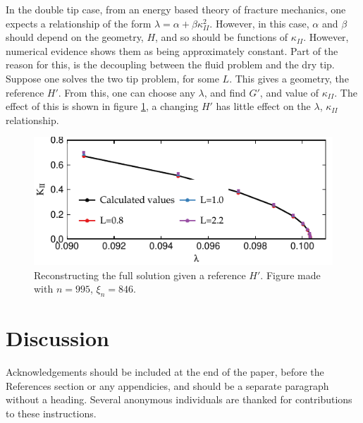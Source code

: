 \documentclass{jfm}
\begin{document}
In the double tip case, from an energy based theory of fracture mechanics,
one expects a relationship of the form $\lambda = \alpha + \beta 
\kappa_{II}^2$. However, in this case, $\alpha$ and $\beta$ should depend on 
the geometry, $H$, and so should be functions of $\kappa_{II}$. However, 
numerical evidence shows them as being approximately constant. Part of the 
reason for this, is the decoupling between the fluid problem and the dry tip. 
Suppose one solves the two tip problem, for some $L$. This gives a geometry, 
the reference $H'$. From this, one can choose any $\lambda$, and find $G'$, 
and value of $\kappa_{II}$. The effect of this is shown in figure 
\ref{fig:fixed-fluid}, a changing $H'$ has little effect on the $\lambda$, 
$\kappa_{II}$ relationship.


\begin{figure}
 \centerline{
\includegraphics{./../../Graphs/fixed-fluid.pdf}}
  \caption{Reconstructing the full solution given a reference $H'$. Figure 
           made with $n=995$, $\xi_n = 846$.}\label{fig:fixed-fluid}
\end{figure}
\section{Discussion}

Acknowledgements should be included at the end of the paper, before the 
References section or any appendicies, and should be a separate paragraph 
without a heading. Several anonymous individuals are thanked for contributions 
to these instructions.



\end{document}
